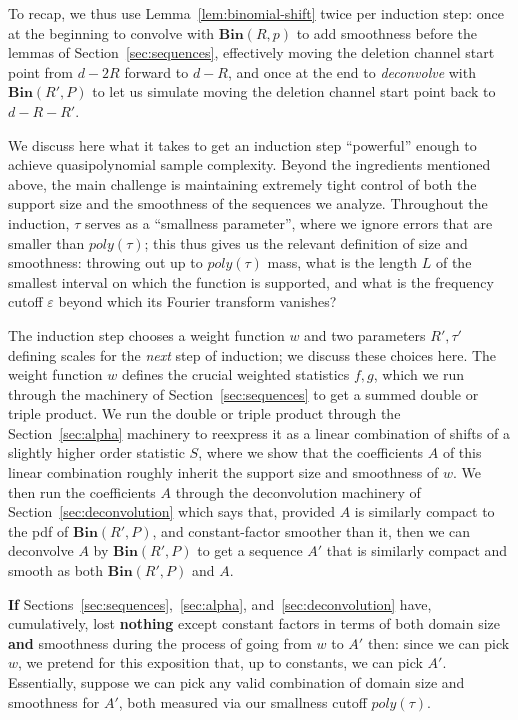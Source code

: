 \documentclass[11pt]{article}
\theoremstyle{plain}
\newcommand{\Bin}[2]{\textbf{Bin}(#1,#2)}
\newcommand{\eps}{\varepsilon}
\begin{document}
To recap, we thus use Lemma~\ref{lem:binomial-shift} twice per induction step: once at the beginning to convolve with $\Bin{R}{p}$ to add smoothness before the lemmas of Section~\ref{sec:sequences}, effectively moving the deletion channel start point from $d-2R$ forward to $d-R$, and once at the end to \emph{deconvolve} with $\Bin{R'}{P}$ to let us simulate moving the deletion channel start point back to $d-R-R'$. 

 

\medskip{}

We discuss here what it takes to get an induction step  ``powerful'' enough to achieve quasipolynomial sample complexity. Beyond the ingredients mentioned above, the main challenge is maintaining extremely tight control of both the support size and the smoothness of the sequences we analyze. Throughout the induction, $\tau$ serves as a ``smallness parameter'', where we ignore errors that are smaller than $poly(\tau)$; this thus gives us the relevant definition of size and smoothness: throwing out up to $poly(\tau)$ mass, what is the length $L$ of the smallest interval on which the function is supported, and what is the frequency cutoff $\eps$ beyond which its Fourier transform vanishes? 

The induction step chooses a weight function $w$ and two parameters $R',\tau'$ defining scales for the \emph{next} step of induction; we discuss these choices here. 
The weight function $w$ defines the crucial weighted statistics $f,g$, which we run through the machinery of Section~\ref{sec:sequences} to get a summed double or triple product. We run the double or triple product through the Section~\ref{sec:alpha} machinery to reexpress it as a linear combination of shifts of a slightly higher order statistic $S$, where we show that the coefficients $A$ of this linear combination roughly inherit the support size and smoothness of $w$. We then run the coefficients $A$ through the deconvolution machinery of Section~\ref{sec:deconvolution} which says that, provided $A$ is similarly compact to the pdf of $\Bin{R'}{P}$, and constant-factor smoother than it, then we can deconvolve $A$ by $\Bin{R'}{P}$ to get a sequence $A'$ that is similarly compact and smooth as both $\Bin{R'}{P}$ and $A$.

\textbf{If} Sections~\ref{sec:sequences},~\ref{sec:alpha}, and~\ref{sec:deconvolution} have, cumulatively, lost \textbf{nothing} except constant factors in terms of both domain size \textbf{and} smoothness during the process of going from $w$ to $A'$ then: since we can pick $w$, we pretend for this exposition that, up to constants, we can pick $A'$. Essentially, suppose we can pick any valid combination of domain size and smoothness for $A'$, both measured via our smallness cutoff $poly(\tau)$.
\end{document}
